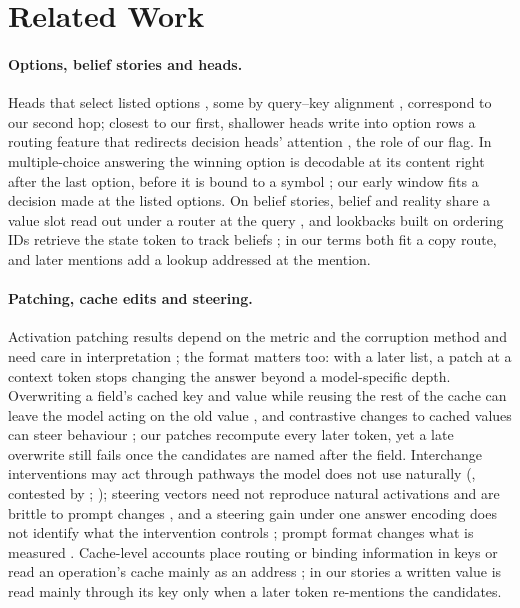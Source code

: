 \section{Related Work}\label{sec:related}

\paragraph{Options, belief stories and heads.}
Heads that select listed options \citep{lieberum2023chinchilla,wiegreffe2025answer}, some by query--key alignment \citep{tulchinskii2024wise}, correspond to our second hop; closest to our first, shallower heads write into option rows a routing feature that redirects decision heads' attention \citep{sun2026persuaded}, the role of our flag. In multiple-choice answering the winning option is decodable at its content right after the last option, before it is bound to a symbol \citep{wong2026decide}; our early window fits a decision made at the listed options. On belief stories, belief and reality share a value slot read out under a router at the query \citep{steele2026routing}, and lookbacks built on ordering IDs retrieve the state token to track beliefs \citep{prakash2025lookbacks}; in our terms both fit a copy route, and later mentions add a lookup addressed at the mention.

\paragraph{Patching, cache edits and steering.}
Activation patching results depend on the metric and the corruption method \citep{zhang2023patching} and need care in interpretation \citep{heimersheim2024patching}; the format matters too: with a later list, a patch at a context token stops changing the answer beyond a model-specific depth. Overwriting a field's cached key and value while reusing the rest of the cache can leave the model acting on the old value \citep{bojieli2026notes}, and contrastive changes to cached values can steer behaviour \citep{pustovit2026packs}; our patches recompute every later token, yet a late overwrite still fails once the candidates are named after the field. Interchange interventions \citep{geiger2021inducing,geiger2024finding} may act through pathways the model does not use naturally (\citealp{makelov2024subspace}, contested by \citealp{wu2024reply}; \citealp{liu2026wrong}); steering vectors \citep{turner2023actadd,panickssery2023caa} need not reproduce natural activations \citep{shih2026steering} and are brittle to prompt changes \citep{tan2024steering}, and a steering gain under one answer encoding does not identify what the intervention controls \citep{gao2026encodings}; prompt format changes what is measured \citep{sclar2023quantifying,opielka2026causality}. Cache-level accounts place routing or binding information in keys \citep{ma2025addressbook,oh2026rebinding} or read an operation's cache mainly as an address \citep{wu2026record}; in our stories a written value is read mainly through its key only when a later token re-mentions the candidates.
